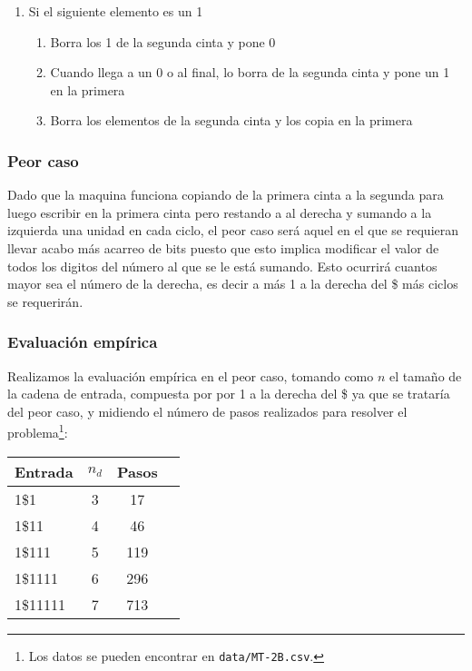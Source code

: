 \begin{itemize}
\begin{enumerate}
\begin{enumerate}
        \end{enumerate}
        \item Si el siguiente elemento es un 1
        \begin{enumerate}
            \item Borra los 1 de la segunda cinta y pone 0
            \item Cuando llega a un 0 o al final, lo borra de la segunda cinta y pone un 1 en la primera
            \item Borra los elementos de la segunda cinta y los copia en la primera
        \end{enumerate}
    \end{enumerate}
\end{itemize}



\subsubsection*{Peor caso}
Dado que la maquina funciona copiando de la primera cinta a la segunda para luego escribir en la primera cinta pero restando a al derecha y sumando a la izquierda una unidad en cada ciclo, el peor caso será aquel en el que se requieran llevar acabo más acarreo de bits puesto que esto implica modificar el valor de todos los digitos del número al que se le está sumando. Esto ocurrirá cuantos mayor sea el número de la derecha, es decir a más 1 a la derecha del \$ más ciclos se requerirán.\medskip

\subsubsection*{Evaluación empírica}
Realizamos la evaluación empírica en el peor caso, tomando como $n$ el tamaño de la cadena de entrada, compuesta por por 1 a la derecha del \$ ya que se trataría del peor caso, y midiendo el número de pasos realizados para resolver el problema\footnote{Los datos se pueden encontrar en \texttt{data/MT-2B.csv}.}:

\begin{table}[h]
    \centering
    \begin{tabular}{lccc}
        Entrada & $n_d$ & Pasos \\
        \hline
        1\$1                     & 3  & 17   \\
        1\$11                    & 4  & 46   \\
        1\$111                   & 5  & 119   \\
        1\$1111                  & 6  & 296  \\
        1\$11111                 & 7  & 713  \\
    \end{tabular}
\end{table}

